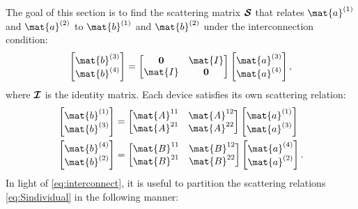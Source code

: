 The goal of this section is to find the scattering matrix $\boldsymbol{\mathcal{S}}$
that relates $\mat{a}\one$ and $\mat{a}\two$ to 
$\mat{b}\one$ and $\mat{b}\two$ under the interconnection condition:
\begin{equation}
  \colvec{\mat{b}\three \\ \mat{b}\four} 
  =
  \begin{bmatrix}
    \0 & \mat{I} \\
    \mat{I} & \0
  \end{bmatrix}
  \colvec{\mat{a}\three \\ \mat{a}\four},
  \label{eq:interconnect}
\end{equation}
where $\boldsymbol{\mathcal{I}}$ is the identity matrix.
Each device satisfies its own scattering relation:
\begin{subequations}
  \label{eq:Sindividual}
  \begin{align}
  \colvec{\mat{b}\one \\ \mat{b}\three} 
  &=
  \begin{bmatrix}
    \mat{A}^{11} & \mat{A}^{12} \\
    \mat{A}^{21} & \mat{A}^{22} 
  \end{bmatrix}
  \colvec{\mat{a}\one \\ \mat{a}\three} \\
  \colvec{\mat{b}\four \\ \mat{b}\two} 
  &=
  \begin{bmatrix}
    \mat{B}^{11} & \mat{B}^{12} \\
    \mat{B}^{21} & \mat{B}^{22} 
  \end{bmatrix}
  \colvec{\mat{a}\four \\ \mat{a}\two}.
  \end{align}
\end{subequations}
In light of \eqref{eq:interconnect}, it is useful to partition the
scattering relations \eqref{eq:Sindividual} in the following manner:
